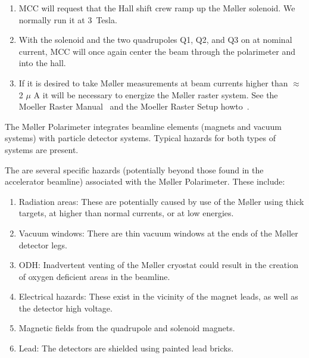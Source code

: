 {\begin{enumerate}
        \item MCC will request that the Hall shift crew ramp up the
	M\o ller solenoid. We normally run it at 3~Tesla.

        \item With the solenoid and the two quadrupoles Q1, Q2, and Q3 on
              at nominal current, MCC will once again center the beam
              through the polarimeter and into the hall.

	\item If it is desired to take M\o ller measurements at beam currents
	      higher than $\approx$ 2 $\mu$ A it will be necessary to energize
	      the M\o ller raster system. See the Moeller Raster
              Manual~\cite{docdb:moellerraster} and the
              Moeller Raster Setup howto~\cite{howto:moeller_raster}.
\end{enumerate}




\begin{safetyen}{0}{0}
%
%

The M\o ller Polarimeter integrates beamline elements (magnets and
vacuum systems) with particle detector systems. Typical hazards for
both types of systems are present.


The are several specific hazards (potentially beyond those found in
the accelerator beamline) associated with the M\o ller Polarimeter.
These include:
\begin{enumerate}
\item{Radiation areas: These are potentially caused by use of the M\o ller using thick targets, at higher than normal currents, or at low energies.}
\item{Vacuum windows: There are thin vacuum windows at the ends of the M\o ller detector legs.}
\item{ODH: Inadvertent venting of the M\o ller cryostat could result in the creation of oxygen deficient areas in the beamline.}
\item{Electrical hazards: These exist in the vicinity of the magnet leads, as well as the detector high voltage.}
\item{Magnetic fields from the quadrupole and solenoid magnets.}
\item{Lead: The detectors are shielded using painted lead bricks.}
\end{enumerate}


\end{safetyen}}
